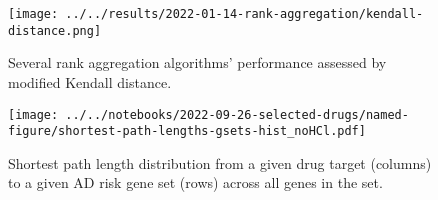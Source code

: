\documentclass[letterpaper]{article}
\begin{document}


\begin{figure}[p]
\texttt{[image: ../../results/2022-01-14-rank-aggregation/kendall-distance.png]}
\caption{
Several rank aggregation algorithms' performance assessed by modified Kendall
distance.
}
\label{fig:kendall-dist}
\end{figure}


\begin{figure}[p]
\texttt{[image: ../../notebooks/2022-09-26-selected-drugs/named-figure/shortest-path-lengths-gsets-hist\_noHCl.pdf]}
\caption{
  Shortest path length distribution from a given drug target (columns) to a given AD risk gene
  set (rows) across all genes in the set.
}
\label{fig:shortest-path-lengths}
\end{figure}


\end{document}
